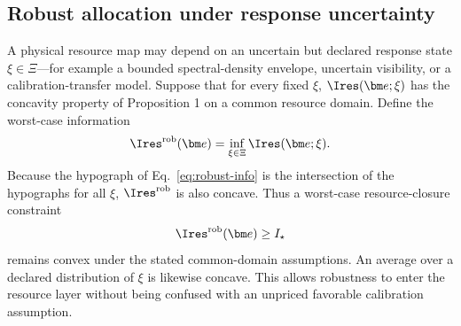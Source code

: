 \subsection{Robust allocation under response uncertainty}

A physical resource map may depend on an uncertain but declared response state $\xi\in\Xi$---for example a bounded spectral-density envelope, uncertain visibility, or a calibration-transfer model. Suppose that for every fixed $\xi$, $\Ires(\bm e;\xi)$ has the concavity property of Proposition 1 on a common resource domain. Define the worst-case information
\begin{equation}
 \Ires^{\rm rob}(\bm e)
 =\inf_{\xi\in\Xi}\Ires(\bm e;\xi).
\label{eq:robust-info}
\end{equation}
Because the hypograph of Eq.~\eqref{eq:robust-info} is the intersection of the hypographs for all $\xi$, $\Ires^{\rm rob}$ is also concave. Thus a worst-case resource-closure constraint
\begin{equation}
 \Ires^{\rm rob}(\bm e)\ge I_\star
\end{equation}
remains convex under the stated common-domain assumptions. An average over a declared distribution of $\xi$ is likewise concave. This allows robustness to enter the resource layer without being confused with an unpriced favorable calibration assumption.
